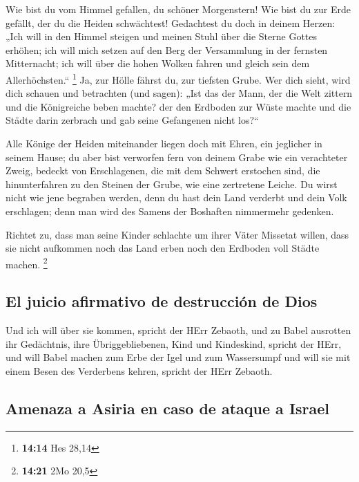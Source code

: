  Wie bist du vom Himmel gefallen, du schöner Morgenstern!
Wie bist du zur Erde gefällt, der du die Heiden schwächtest!
 Gedachtest du doch in deinem Herzen: „Ich will in den
Himmel steigen und meinen Stuhl über die Sterne Gottes erhöhen;
 ich will mich setzen auf den Berg der Versammlung in der
fernsten Mitternacht; ich will über die hohen Wolken fahren und gleich
sein dem Allerhöchsten.`` \footnote{\textbf{14:14} Hes 28,14}
 Ja, zur Hölle fährst du, zur tiefsten Grube.
 Wer dich sieht, wird dich schauen und betrachten (und
sagen): „Ist das der Mann, der die Welt zittern und die Königreiche
beben machte?  der den Erdboden zur Wüste machte und die
Städte darin zerbrach und gab seine Gefangenen nicht los?{}``

 Alle Könige der Heiden miteinander liegen doch mit
Ehren, ein jeglicher in seinem Hause;  du aber bist
verworfen fern von deinem Grabe wie ein verachteter Zweig, bedeckt von
Erschlagenen, die mit dem Schwert erstochen sind, die hinunterfahren zu
den Steinen der Grube, wie eine zertretene Leiche.  Du
wirst nicht wie jene begraben werden, denn du hast dein Land verderbt
und dein Volk erschlagen; denn man wird des Samens der Boshaften
nimmermehr gedenken.

 Richtet zu, dass man seine Kinder schlachte um ihrer
Väter Missetat willen, dass sie nicht aufkommen noch das Land erben noch
den Erdboden voll Städte machen. \footnote{\textbf{14:21} 2Mo 20,5}

\hypertarget{el-juicio-afirmativo-de-destrucciuxf3n-de-dios}{%
\subsection{El juicio afirmativo de destrucción de
Dios}\label{el-juicio-afirmativo-de-destrucciuxf3n-de-dios}}

 Und ich will über sie kommen, spricht der HErr Zebaoth,
und zu Babel ausrotten ihr Gedächtnis, ihre Übriggebliebenen, Kind und
Kindeskind, spricht der HErr,  und will Babel machen zum
Erbe der Igel und zum Wassersumpf und will sie mit einem Besen des
Verderbens kehren, spricht der HErr Zebaoth.

\hypertarget{amenaza-a-asiria-en-caso-de-ataque-a-israel}{%
\subsection{Amenaza a Asiria en caso de ataque a
Israel}\label{amenaza-a-asiria-en-caso-de-ataque-a-israel}}


